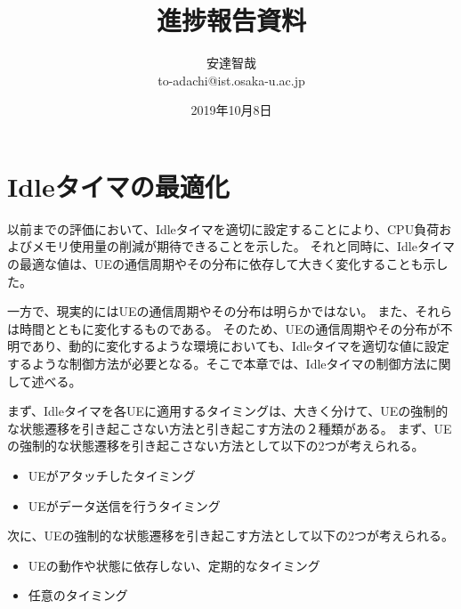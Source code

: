 \documentclass[a4j]{ujarticle}
\title{進捗報告資料}
\author{安達智哉\\to-adachi@ist.osaka-u.ac.jp}
\date{2019年10月8日}
\begin{document}
\maketitle



\section{Idleタイマの最適化}
以前までの評価において、Idleタイマを適切に設定することにより、CPU負荷およびメモリ使用量の削減が期待できることを示した。
それと同時に、Idleタイマの最適な値は、UEの通信周期やその分布に依存して大きく変化することも示した。

一方で、現実的にはUEの通信周期やその分布は明らかではない。
また、それらは時間とともに変化するものである。
そのため、UEの通信周期やその分布が不明であり、動的に変化するような環境においても、Idleタイマを適切な値に設定するような制御方法が必要となる。そこで本章では、Idleタイマの制御方法に関して述べる。

まず、Idleタイマを各UEに適用するタイミングは、大きく分けて、UEの強制的な状態遷移を引き起こさない方法と引き起こす方法の２種類がある。
まず、UEの強制的な状態遷移を引き起こさない方法として以下の2つが考えられる。
\begin{itemize}
  \item UEがアタッチしたタイミング
  \item UEがデータ送信を行うタイミング
\end{itemize}
次に、UEの強制的な状態遷移を引き起こす方法として以下の2つが考えられる。
\begin{itemize}
\item UEの動作や状態に依存しない、定期的なタイミング
\item 任意のタイミング
\end{itemize}
\end{document}
